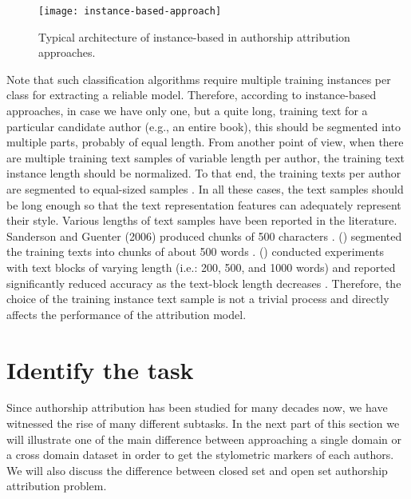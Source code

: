 \begin{figure}[ht]
	\centering
	\texttt{[image: instance-based-approach]}
	\caption[Instance-based approach training schema]{Typical architecture of instance-based in authorship attribution approaches. \cite{stamatatos2009survey}}
	\label{fig:instance_based_approach}
\end{figure}

Note that such classification algorithms require multiple training instances per class for extracting a reliable model. Therefore, according to instance-based approaches, in case
we have only one, but a quite long, training text for a particular candidate author (e.g., an entire book), this should be segmented into multiple parts, probably of equal length.
From another point of view, when there are multiple training text samples of variable length per author, the training text instance length should be normalized. To that end, the training texts per author are segmented to equal-sized samples \cite{sanderson2006short}. In all these cases, the text samples should be long enough so that the text representation features can adequately represent their style. Various lengths of text samples have been reported in the literature. Sanderson and Guenter (2006) produced chunks of 500 characters \cite{sanderson2006short}. \citeauthor{koppel2006authorship} (\citeyear{koppel2006authorship}) segmented the training texts into
chunks of about 500 words \cite{koppel2006authorship}. \citeauthor{hirst2007bigrams} (\citeyear{hirst2007bigrams}) conducted experiments with text blocks of varying length (i.e.: 200, 500, and 1000 words) and reported significantly reduced accuracy as the text-block length decreases \cite{hirst2007bigrams}. Therefore, the choice of the training instance text sample is not a trivial process and directly affects the performance of the attribution model.

\section{Identify the task}

Since authorship attribution has been studied for many decades now, we have witnessed the rise of many different subtasks. In the next part of this section we will illustrate one of the main difference between approaching a single domain or a cross domain dataset in order to get the stylometric markers of each authors.
We will also discuss the difference between closed set and open set authorship attribution problem.

